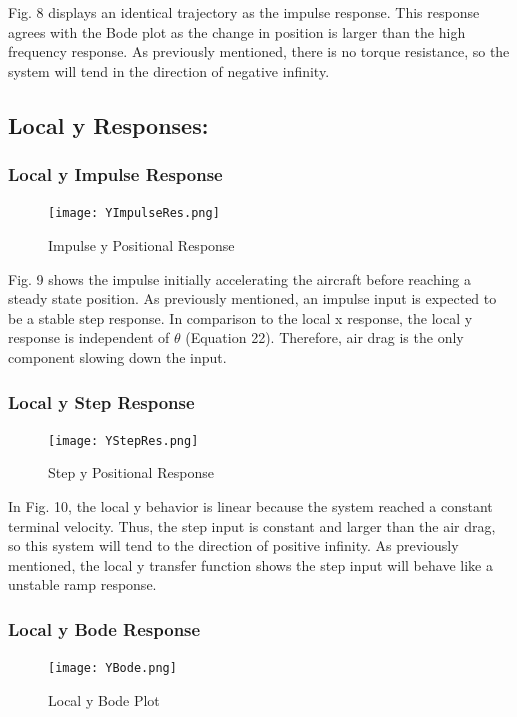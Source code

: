 \documentclass[conference]{IEEEtran}
\begin{document}
Fig. 8 displays an identical trajectory as the impulse response. This response agrees with the Bode plot as the change in position is larger than the high frequency response. As previously mentioned, there is no torque resistance, so the system will tend in the direction of negative infinity. \\

\newpage
\subsection{Local y Responses:}
\subsubsection{Local y Impulse Response} 
\begin{figure}[htbp]
\centerline{\texttt{[image: YImpulseRes.png]}}
\caption{Impulse y Positional Response}
\label{figure}
\end{figure}

Fig. 9 shows the impulse initially accelerating the aircraft before reaching a steady state position. As previously mentioned, an impulse input is expected to be a stable step response. In comparison to the local x response, the local y response is independent of $\theta$ (Equation 22). Therefore, air drag is the only component slowing down the input. \\


\subsubsection{Local y Step Response} 
\begin{figure}[htbp]
\centerline{\texttt{[image: YStepRes.png]}}
\caption{Step y Positional Response}
\label{figure}
\end{figure}

In Fig. 10, the local y behavior is linear because the system reached a constant terminal velocity. Thus, the step input is constant and larger than the air drag, so this system will tend to the direction of positive infinity. As previously mentioned, the local y transfer function shows the step input will behave like a unstable ramp response. 

\newpage
\subsubsection{Local y Bode Response} 
\begin{figure}[htbp]
\centerline{\texttt{[image: YBode.png]}}
\caption{Local y Bode Plot}
\label{figure}
\end{figure}
\end{document}
